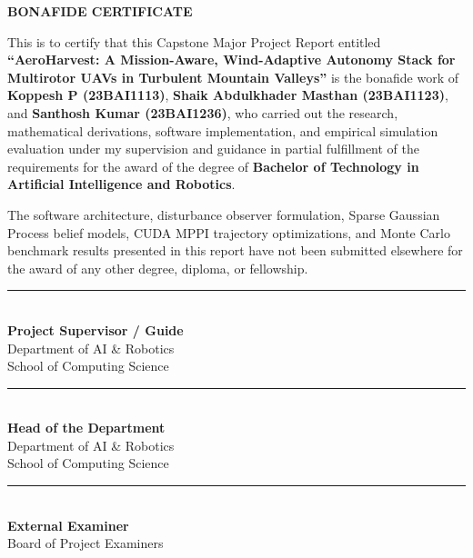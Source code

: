 \documentclass[12pt,a4paper,oneside]{report}
\begin{document}
\setcounter{page}{1}

\newpage
\thispagestyle{plain}
\begin{center}
    \vspace*{5mm}
    {\LARGE \textbf{BONAFIDE CERTIFICATE}}\\[8mm]
\end{center}

This is to certify that this Capstone Major Project Report entitled \textbf{``AeroHarvest: A Mission-Aware, Wind-Adaptive Autonomy Stack for Multirotor UAVs in Turbulent Mountain Valleys''} is the bonafide work of \textbf{Koppesh P (23BAI1113)}, \textbf{Shaik Abdulkhader Masthan (23BAI1123)}, and \textbf{Santhosh Kumar (23BAI1236)}, who carried out the research, mathematical derivations, software implementation, and empirical simulation evaluation under my supervision and guidance in partial fulfillment of the requirements for the award of the degree of \textbf{Bachelor of Technology in Artificial Intelligence and Robotics}.

The software architecture, disturbance observer formulation, Sparse Gaussian Process belief models, CUDA MPPI trajectory optimizations, and Monte Carlo benchmark results presented in this report have not been submitted elsewhere for the award of any other degree, diploma, or fellowship.

\vspace{25mm}
\noindent
\begin{minipage}{0.45\textwidth}
    \rule{0.9\textwidth}{0.5pt}\\
    \textbf{Project Supervisor / Guide}\\
    Department of AI \& Robotics\\
    School of Computing Science
\end{minipage}
\hfill
\begin{minipage}{0.45\textwidth}
    \flushright
    \rule{0.9\textwidth}{0.5pt}\\
    \textbf{Head of the Department}\\
    Department of AI \& Robotics\\
    School of Computing Science
\end{minipage}

\vspace{25mm}
\noindent
\begin{center}
    \begin{minipage}{0.5\textwidth}
        \centering
        \rule{0.9\textwidth}{0.5pt}\\
        \textbf{External Examiner}\\
        Board of Project Examiners
    \end{minipage}
\end{center}
\end{document}
